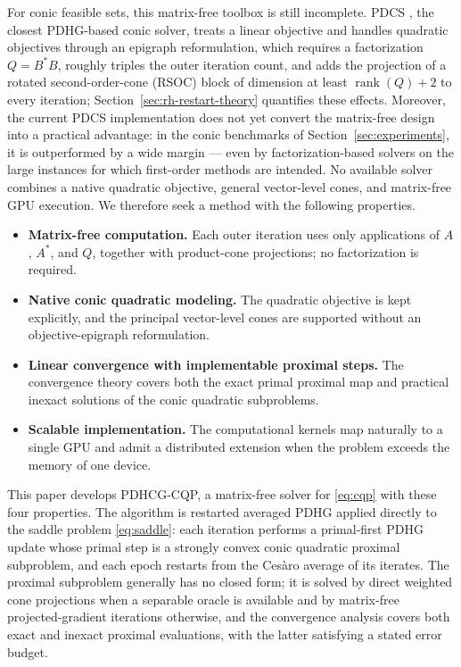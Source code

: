\documentclass[letterpaper]{article} %
\newcommand{\name}{PDHCG-CQP\xspace}
\theoremstyle{definition}
\theoremstyle{remark}
\begin{document}
For conic feasible sets, this matrix-free toolbox is still incomplete.
PDCS \cite{lin2025pdcs}, the closest PDHG-based conic solver, treats a
linear objective and handles quadratic objectives through an epigraph
reformulation, which requires a factorization $Q=B^*B$, roughly triples
the outer iteration count, and adds the projection of a rotated second-order-cone (RSOC) block of
dimension at least $\operatorname{rank}(Q)+2$ to every iteration;
Section~\ref{sec:rh-restart-theory} quantifies these effects.  Moreover,
the current PDCS implementation does not yet convert the matrix-free
design into a practical advantage: in the conic benchmarks of
Section~\ref{sec:experiments}, it is outperformed by a wide margin --- even
by factorization-based solvers on the large instances for which
first-order methods are intended.  No available solver combines a native
quadratic objective, general vector-level cones, and matrix-free GPU
execution.  We therefore seek a method with the following properties.
\begin{itemize}
    \item \textbf{Matrix-free computation.}
    Each outer iteration uses only applications of $A$, $A^*$, and $Q$,
    together with product-cone projections; no factorization is required.

    \item \textbf{Native conic quadratic modeling.}
    The quadratic objective is kept explicitly, and the principal
    vector-level cones are supported without an objective-epigraph
    reformulation.

    \item \textbf{Linear convergence with implementable proximal steps.}
    The convergence theory covers both the exact primal proximal map and
    practical inexact solutions of the conic quadratic subproblems.

    \item \textbf{Scalable implementation.}
    The computational kernels map naturally to a single GPU and admit a
    distributed extension when the problem exceeds the memory of one
    device.
\end{itemize}

This paper develops \name, a matrix-free solver for \eqref{eq:cqp} with
these four properties.  The algorithm is restarted averaged PDHG applied
directly to the saddle problem \eqref{eq:saddle}: each iteration performs a
primal-first PDHG update whose primal step is a strongly convex conic
quadratic proximal subproblem, and each epoch restarts from the Ces\`aro
average of its iterates.  The proximal subproblem generally has no closed
form; it is solved by direct weighted cone projections when a separable
oracle is available and by matrix-free projected-gradient iterations
otherwise, and the convergence analysis covers both exact and inexact
proximal evaluations, with the latter satisfying a stated error budget.
\end{document}
